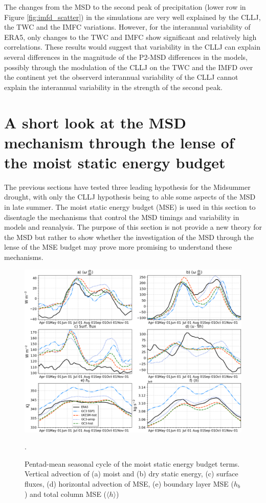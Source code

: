 The changes from the MSD to the second peak of precipitation (lower row in Figure \ref{fig:imfd_scatter}) in the simulations are very well explained by the CLLJ, the TWC and the IMFC variations. However, for the interannual variability of ERA5, only changes to the TWC and IMFC show significant and relatively high correlations. These results would suggest that variability in the CLLJ can explain several differences in the magnitude of the P2-MSD differences in the models, possibly through the modulation of the CLLJ on the TWC and the IMFD over the continent yet the observerd interannual variability of the CLLJ cannot explain the interannual variability in the strength of the second peak. %



\section{A short look at the MSD mechanism through the lense of the moist static energy budget}

The previous sections have tested three leading hypothesis for the Midsummer drought, with only the CLLJ hypothesis being to able some aspects of the MSD in late summer. 
The moist static energy budget (MSE) is used in this section to disentagle the mechanisms that control the MSD timings and variability in models and reanalysis. The purpose of this section is not provide a new theory for the MSD but rather to show whether the investigation of the MSD through the lense of the MSE budget may prove more promising to understand these mechanisms. 

\begin{figure}[t!]
\includegraphics[width=\linewidth]{figures/thermopentad}
\caption[Seasonal cycle of MSE budget terms]{Pentad-mean seasonal cycle of the moist static energy budget terms. Vertical advection of (a) moist and (b) dry static energy, (c) surface fluxes, (d) horizontal advection of MSE, (e) boundary layer MSE ($h_b$) and total column MSE ($\langle h \rangle$) }. 
\label{fig:thermo_pentad}
\end{figure}


